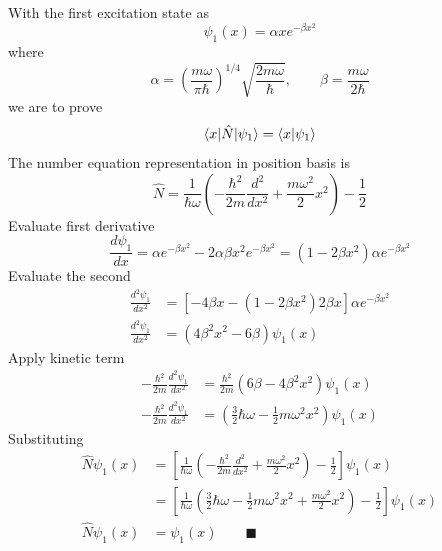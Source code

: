 \documentclass[../../../main.tex]{subfiles}
\begin{document}
With the first excitation state as 
\begin{equation*}
  \psi_1 (x)
  =\alpha x e^{-\beta x^2}
\end{equation*}
where
\begin{equation*}
  \alpha = \left( \frac{m \omega}{\pi \hbar} \right)^{1/4} \sqrt{\frac{2m \omega}{\hbar}} ,\qquad
  \beta = \frac{m \omega}{2 \hbar}
\end{equation*}
we are to prove 
\begin{equation*}
  \braket{x | \hat{N }|\psi_1} = \braket{x  | \psi_1}
\end{equation*}
The number equation representation in position basis is 
\begin{equation*}
  \hat{N} =  \frac{1}{ \hbar \omega} \left( -\frac{\hbar ^2}{2m}\frac{d^2 }{dx^2} +\frac{ m \omega^2 }{2} x^2 \right) - \frac{1}{2}
\end{equation*}
Evaluate first derivative
\begin{equation*}
  \frac{d\psi_1}{dx} = \alpha e^{-\beta x^2} - 2\alpha \beta x^2 e^{-\beta x^2} = (1 - 2\beta x^2)\alpha e^{-\beta x^2} 
\end{equation*}
Evaluate the second 
\begin{align*}
    \frac{d^2\psi_1}{dx^2} 
    &=  \left[ -4\beta x - (1 - 2\beta x^{2})2\beta x  \right] \alpha e^{-\beta x^{2}} \\
    \frac{d^2\psi_1}{dx^2} 
&=  (4\beta^2 x^2 - 6\beta ) \psi_1 (x)
\end{align*}
Apply kinetic term
\begin{align*}
-\frac{\hbar^2}{2m} \frac{d^2\psi_1}{dx^2} 
&=  \frac{\hbar^2}{2m}  (6\beta - 4\beta^2 x^2) \psi_1 (x)\\
-\frac{\hbar^2}{2m} \frac{d^2\psi_1}{dx^2} 
&=   \left( \frac{3}{2} \hbar \omega  - \frac{1}{2} m \omega^2 x^2 \right) \psi_1 (x)
\end{align*}
Substituting
\begin{align*}
  \hat{N} \psi_1 (x) 
  &= \left[   \frac{1}{ \hbar \omega} \left( -\frac{\hbar ^2}{2m}\frac{d^2 }{dx^2} +\frac{ m \omega^2 }{2} x^2 \right) - \frac{1}{2} \right] \psi_1 (x)\\
  &= \left[   \frac{1}{ \hbar \omega} \left( \frac{3}{2} \hbar \omega  - \frac{1}{2} m \omega^2 x^2 +\frac{ m \omega^2 }{2} x^2 \right) - \frac{1}{2} \right] \psi_1 (x)\\
  \hat{N} \psi_1 (x) &= \psi_1 (x)  \qquad\blacksquare
\end{align*}
\end{document}
